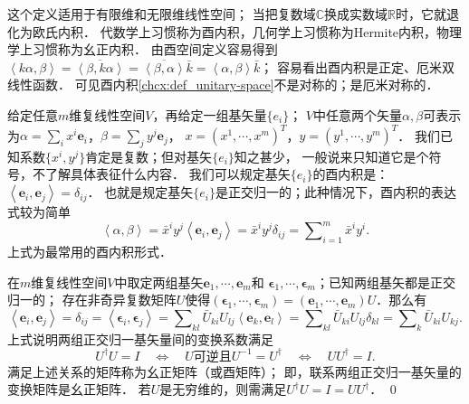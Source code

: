  
 


这个定义适用于有限维和无限维线性空间；
当把复数域$\mathbb{C}$换成实数域$\mathbb{R}$时，它就退化为欧氏内积．
代数学上习惯称为酉内积，几何学上习惯称为Hermite内积，物理学上习惯称为幺正内积．
由酉空间定义容易得到
$\left<k\alpha,\beta\right>=\overline{\left<\beta,k\alpha\right>}
=\overline{\left<\beta,\alpha\right>} \bar{k} = \left<\alpha,\beta\right>\bar{k}$；
容易看出酉内积是正定、厄米双线性函数．
可见酉内积\ref{chcx:def_unitary-space}不是对称的；是厄米对称的．

给定任意$m$维复线性空间$V$，再给定一组基矢量$\{{e}_i\}$；
$V$中任意两个矢量$\alpha,\beta$可表示
为$\alpha=\sum_i x^i \boldsymbol{e}_i$，$\beta=\sum_j y^j \boldsymbol{e}_j$，
$x=(x^1,\cdots,x^m)^T$，$y=(y^1,\cdots,y^m)^T$．
我们已知系数$\{x^i,y^j\}$肯定是复数；但对基矢$\{{e}_i\}$知之甚少，
一般说来只知道它是个符号，不了解具体表征什么内容．
我们可以规定基矢$\{{e}_i\}$的酉内积是：
$    \left<\boldsymbol{e}_i,\boldsymbol{e}_j\right> = \delta_{ij}$．
也就是规定基矢$\{{e}_i\}$是正交归一的；此种情况下，酉内积的表达式较为简单
\begin{equation}\label{chcx:eqn_Hermite-Product}
    \left<\alpha,\beta\right>=\bar{x}^i y^j \left<\boldsymbol{e}_i,\boldsymbol{e}_j\right>
     =\bar{x}^i y^j \delta_{ij} = \sum\nolimits_{i=1}^{m}\bar{x}^i y^i.
\end{equation}
上式为最常用的酉内积形式．

\begin{example}
    在$m$维复线性空间$V$中取定两组基矢$\boldsymbol{e}_1,\cdots,\boldsymbol{e}_m$和
   $\boldsymbol{\epsilon}_1,\cdots,\boldsymbol{\epsilon}_m$；已知两组基矢都是正交归一的；
   存在非奇异复数矩阵$U$使得$(\boldsymbol{\epsilon}_1,\cdots,\boldsymbol{\epsilon}_m)
   =(\boldsymbol{e}_1,\cdots,\boldsymbol{e}_m)U$．那么有
   \begin{equation*}
       \left<\boldsymbol{e}_i,\boldsymbol{e}_j\right> = \delta_{ij} 
       =\left<\boldsymbol{\epsilon}_i,\boldsymbol{\epsilon}_j\right> 
       =\sum\nolimits_{kl}\bar{U}_{ki} U_{lj}\left<\boldsymbol{e}_k,\boldsymbol{e}_l\right>
       =\sum\nolimits_{kl}\bar{U}_{ki} U_{lj}\delta_{kl}
       =\sum\nolimits_{k}\bar{U}_{ki} U_{kj} .
   \end{equation*}
   上式说明两组正交归一基矢量间的变换系数满足
   \begin{equation}
       U^\dagger U = I \quad \Leftrightarrow\quad
       U \text {可逆且} U^{-1} = U^\dagger \quad \Leftrightarrow\quad
       U U^\dagger = I .
   \end{equation}
   满足上述关系的矩阵称为{\heiti 幺正矩阵}（或酉矩阵）；
   即，联系两组正交归一基矢量的变换矩阵是幺正矩阵．
   若$U$是无穷维的，则需满足$U^\dagger U = I=U U^\dagger$．   \qed
\end{example}


